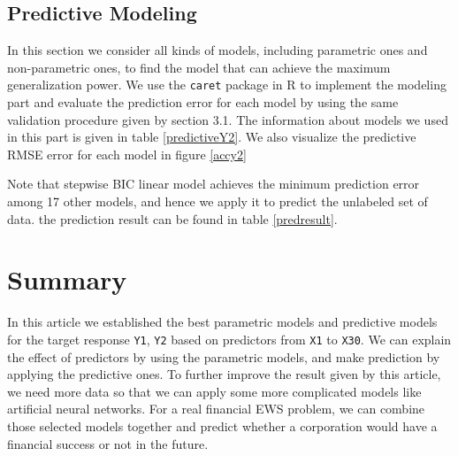 \documentclass[11pt,oneside,a4paper]{article}
\newcommand{\m}[1]{\texttt{{#1}}}
\begin{document}
\subsection{Predictive Modeling}
In this section we consider all kinds of models, including parametric ones and non-parametric ones, to find the model that can achieve the maximum generalization power. We use the \m{caret} package in R to implement the modeling part and evaluate the prediction error for each model by using the same validation procedure given by section 3.1. The information about models we used in this part is given in table \ref{predictiveY2}. We also visualize the predictive RMSE error for each model in figure \ref{accy2}

Note that stepwise BIC linear model achieves the minimum prediction error among 17 other models, and hence we apply it to predict the unlabeled set of data. the prediction result can be found in table \ref{predresult}.

\section{Summary}
In this article we established the best parametric models and predictive models for the target response \m{Y1}, \m{Y2} based on predictors from \m{X1} to \m{X30}. We can explain the effect of predictors by using the parametric models, and make prediction by applying the predictive ones. To further improve the result given by this article, we need more data so that we can apply some more complicated models like artificial neural networks. For a real financial EWS problem, we can combine those selected models together and predict whether a corporation would have a financial success or not in the future.

\clearpage
\printbibliography 
\clearpage
\end{document}
